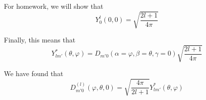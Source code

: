 \documentclass[a4paper,twoside,master.tex]{subfiles}
\begin{document}
For homework, we will show that
\begin{equation}
    Y_0^l(0,0) = \sqrt{\frac{2l+1}{4 \pi}}
\end{equation}

Finally, this means that
\begin{equation}
    Y^*_{lm'}(\theta , \varphi) = D_{m'0}(\alpha = \varphi, \beta = \theta, \gamma = 0) \sqrt{\frac{2l+1}{4 \pi}} 
\end{equation}

We have found that
\begin{equation}
    D^{(l)}_{m'0}(\varphi, \theta, 0) = \sqrt{\frac{4 \pi}{2l+1}} Y^*_{lm'}(\theta, \varphi)
\end{equation}
\end{document}

